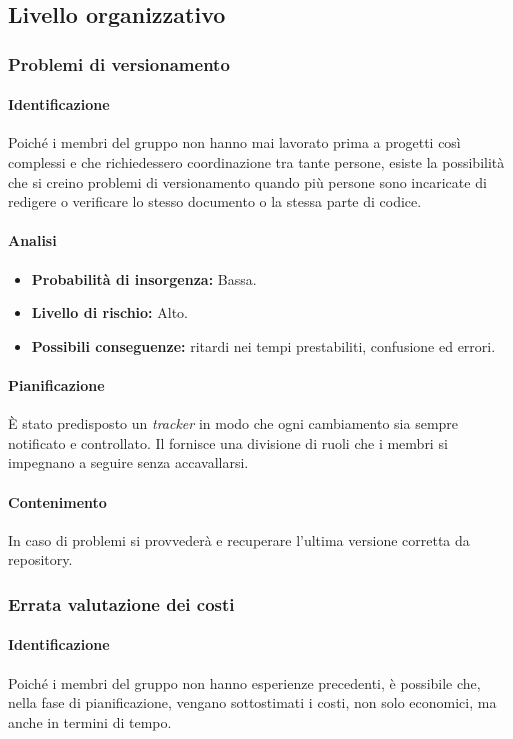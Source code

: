 \subsection{Livello organizzativo}
\subsubsection{Problemi di versionamento}
\paragraph {Identificazione}
Poiché i membri del gruppo non hanno mai lavorato prima a progetti così complessi e che richiedessero coordinazione tra tante persone, esiste la possibilità che si creino problemi di versionamento quando più persone sono incaricate di redigere o verificare lo stesso documento o la stessa parte di codice.

\paragraph {Analisi}
\begin{itemize}
	\item \textbf{Probabilità di insorgenza:} Bassa.
	\item \textbf{Livello di rischio:} Alto.
	\item \textbf{Possibili conseguenze:} ritardi nei tempi prestabiliti, confusione ed errori.
\end{itemize}

\paragraph {Pianificazione}
È stato predisposto un \emph{tracker} in modo che ogni cambiamento sia sempre notificato e controllato. Il \RdP{} fornisce una divisione di ruoli che i membri si impegnano a seguire senza accavallarsi.

\paragraph {Contenimento}
In caso di problemi si provvederà e recuperare l'ultima versione corretta da repository.

\subsubsection{Errata valutazione dei costi}
\paragraph {Identificazione}
Poiché i membri del gruppo non hanno esperienze precedenti, è possibile che, nella fase di pianificazione, vengano sottostimati i costi, non solo economici, ma anche in termini di tempo.

